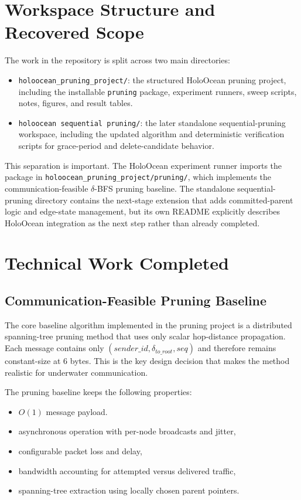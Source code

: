 \documentclass[11pt,a4paper]{article}
\begin{document}
\section{Workspace Structure and Recovered Scope}

The work in the repository is split across two main directories:

\begin{itemize}
  \item \texttt{holoocean\_pruning\_project/}: the structured HoloOcean pruning project, including the installable \texttt{pruning} package, experiment runners, sweep scripts, notes, figures, and result tables.
  \item \texttt{holoocean sequential pruning/}: the later standalone sequential-pruning workspace, including the updated algorithm and deterministic verification scripts for grace-period and delete-candidate behavior.
\end{itemize}

This separation is important. The HoloOcean experiment runner imports the package in \texttt{holoocean\_pruning\_project/pruning/}, which implements the communication-feasible \(\delta\)-BFS pruning baseline. The standalone sequential-pruning directory contains the next-stage extension that adds committed-parent logic and edge-state management, but its own README explicitly describes HoloOcean integration as the next step rather than already completed.

\section{Technical Work Completed}

\subsection{Communication-Feasible Pruning Baseline}

The core baseline algorithm implemented in the pruning project is a distributed spanning-tree pruning method that uses only scalar hop-distance propagation. Each message contains only \((\textit{sender\_id}, \delta_{to\_root}, \textit{seq})\) and therefore remains constant-size at 6 bytes. This is the key design decision that makes the method realistic for underwater communication.

The pruning baseline keeps the following properties:
\begin{itemize}
  \item \(O(1)\) message payload.
  \item asynchronous operation with per-node broadcasts and jitter,
  \item configurable packet loss and delay,
  \item bandwidth accounting for attempted versus delivered traffic,
  \item spanning-tree extraction using locally chosen parent pointers.
\end{itemize}
\end{document}
